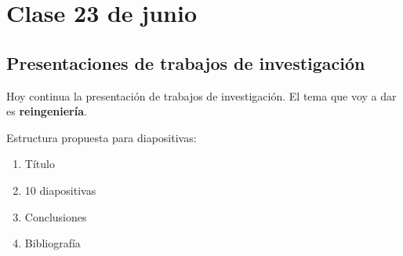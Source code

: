 \section{Clase 23 de junio}

\subsection{Presentaciones de trabajos de investigación}

Hoy continua la presentación de trabajos de investigación.
El tema que voy a dar es \textbf{reingeniería}.

Estructura propuesta para diapositivas:
\begin{enumerate}
    \item Título
    \item 10 diapositivas
    \item Conclusiones
    \item Bibliografía
\end{enumerate}